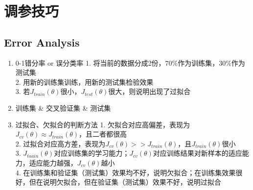 \section{调参技巧}

\subsection{Error Analysis}
\begin{enumerate}
	\item 0-1错分率 or 误分类率
	1. 将当前的数据分成2份，$70\%$作为训练集，$30\%$作为测试集\\
	2. 用新的训练集训练，用新的测试集检验效果\\
	3. 若$J_{train}(\theta)$很小，$J_{test}(\theta)$很大，则说明出现了过拟合
	\item 训练集 \& 交叉验证集 \& 测试集
	\item 过拟合、欠拟合的判断方法
	1. 欠拟合对应高偏差，表现为$J_{cv}(\theta) \approx J_{train}(\theta)$，且二者都很高 \\
	2. 过拟合对应高方差，表现为$J_{cv}(\theta) >> J_{train}(\theta)$，且$J_{train}(\theta)$很小 \\
	3. $J_{taain}(\theta)$对应训练集的学习能力；$J_{cv}(\theta)$对应训练结果对新样本的适应能力，适应能力越强，$J_{cv}(\theta)$越小 \\
	4. 在训练集和验证集（测试集）效果均不好，说明欠拟合；在训练集效果很好，但在说明欠拟合，但在验证集（测试集）效果不好，说明过拟合
\end{enumerate}

